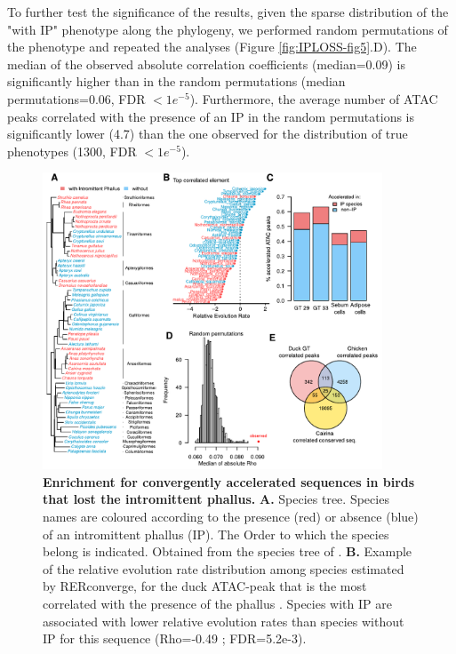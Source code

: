 To further test the significance of the results, given the sparse distribution of the "with IP" phenotype along the phylogeny, we performed random permutations of the phenotype and repeated the analyses (Figure \ref{fig:IPLOSS-fig5}.D). The median of the observed absolute correlation coefficients (median=0.09) is significantly higher than in the random permutations (median permutations=0.06, FDR $<1e^{-5}$). Furthermore, the average number of ATAC peaks correlated with the presence of an IP in the random permutations is significantly lower (4.7) than the one observed for the distribution of true phenotypes (1300, FDR $<1e^{-5}$).


\begin{figure}[hbt!]
 \centering
 \includegraphics[width=0.9\textwidth, page=1] {figures/IPLOSS/Fig_evol_peaks.pdf}
 \caption[Enrichment for convergently accelerated sequences in birds that lost the intromittent phallus.]{
 \textbf{Enrichment for convergently accelerated sequences in birds that lost the intromittent phallus.}
 \textbf{A.} Species tree. Species names are coloured according to the presence (red) or absence (blue) of an intromittent phallus (IP). The Order to which the species belong is indicated. Obtained from the species tree of \citep{feng_dense_2020}. 
 \textbf{B.} Example of the relative evolution rate distribution among species estimated by RERconverge, for the duck ATAC-peak that is the most correlated with the presence of the phallus \citep{kowalczyk_rerconverge_2019}. Species with IP are associated with lower relative evolution rates than species without IP for this sequence (Rho=-0.49 ; FDR=5.2e-3). 
}
\end{figure}
